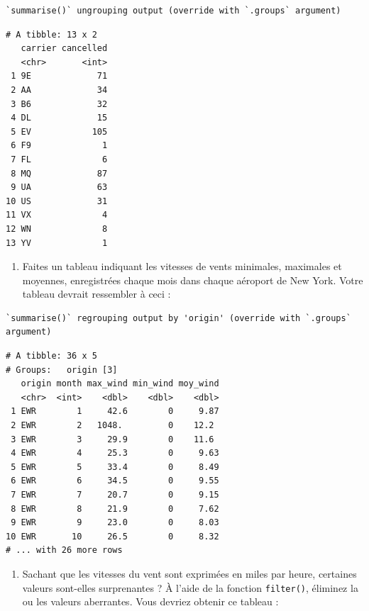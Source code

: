 \documentclass[
  a4paper,
]{article}
\providecommand{\tightlist}{%
  \setlength{\itemsep}{0pt}\setlength{\parskip}{0pt}}
\begin{document}
\begin{verbatim}
`summarise()` ungrouping output (override with `.groups` argument)
\end{verbatim}

\begin{verbatim}
# A tibble: 13 x 2
   carrier cancelled
   <chr>       <int>
 1 9E             71
 2 AA             34
 3 B6             32
 4 DL             15
 5 EV            105
 6 F9              1
 7 FL              6
 8 MQ             87
 9 UA             63
10 US             31
11 VX              4
12 WN              8
13 YV              1
\end{verbatim}

\begin{enumerate}
\def\labelenumi{\arabic{enumi}.}
\setcounter{enumi}{1}
\tightlist
\item
  Faites un tableau indiquant les vitesses de vents minimales, maximales et moyennes, enregistrées chaque mois dans chaque aéroport de New York. Votre tableau devrait ressembler à ceci :
\end{enumerate}

\begin{verbatim}
`summarise()` regrouping output by 'origin' (override with `.groups` argument)
\end{verbatim}

\begin{verbatim}
# A tibble: 36 x 5
# Groups:   origin [3]
   origin month max_wind min_wind moy_wind
   <chr>  <int>    <dbl>    <dbl>    <dbl>
 1 EWR        1     42.6        0     9.87
 2 EWR        2   1048.         0    12.2 
 3 EWR        3     29.9        0    11.6 
 4 EWR        4     25.3        0     9.63
 5 EWR        5     33.4        0     8.49
 6 EWR        6     34.5        0     9.55
 7 EWR        7     20.7        0     9.15
 8 EWR        8     21.9        0     7.62
 9 EWR        9     23.0        0     8.03
10 EWR       10     26.5        0     8.32
# ... with 26 more rows
\end{verbatim}

\begin{enumerate}
\def\labelenumi{\arabic{enumi}.}
\setcounter{enumi}{2}
\tightlist
\item
  Sachant que les vitesses du vent sont exprimées en miles par heure, certaines valeurs sont-elles surprenantes ? À l'aide de la fonction \texttt{filter()}, éliminez la ou les valeurs aberrantes. Vous devriez obtenir ce tableau :
\end{enumerate}
\end{document}
